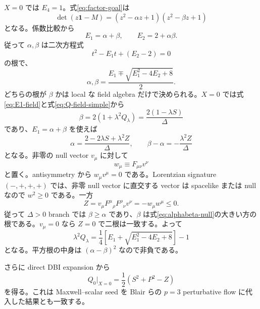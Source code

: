 \documentclass[a4paper,11pt]{ltjsreport}
\newcommand{\Id}{\mathbf 1}
\begin{document}
$X=0$ では $E_4=1$。式\eqref{eq:factor-goal}は
\begin{equation}
 \det(z\Id-M)
 =(z^2-\alpha z+1)(z^2-\beta z+1)
\end{equation}
となる。係数比較から
\begin{equation}
 E_1=\alpha+\beta,
 \qquad
 E_2=2+\alpha\beta.
\end{equation}
従って $\alpha,\beta$ は二次方程式
\begin{equation}
 t^2-E_1t+(E_2-2)=0
\end{equation}
の根で、
\begin{equation}
 \alpha,\beta
 =\frac{E_1\mp\sqrt{E_1^2-4E_2+8}}{2}.
 \label{eq:alphabeta-null}
\end{equation}
どちらの根が $\beta$ かは local な field algebra だけで決められる。$X=0$ では式\eqref{eq:E1-field}と式\eqref{eq:Q-field-simple}から
\begin{equation}
 \beta=2(1+\lambda^2Q_\lambda)
 =\frac{2(1-\lambda S)}{\Delta}
 \label{eq:beta-null-field-note}
\end{equation}
であり、$E_1=\alpha+\beta$ を使えば
\begin{equation}
 \alpha=\frac{2-2\lambda S+\lambda^2Z}{\Delta},
 \qquad
 \beta-\alpha=-\frac{\lambda^2Z}{\Delta}
 \label{eq:alpha-beta-null-note}
\end{equation}
となる。非零の null vector $v_\mu$ に対して
\begin{equation}
 w_\mu\equiv F_{\mu\nu}v^\nu
\end{equation}
と置く。antisymmetry から $w_\mu v^\mu=0$ である。Lorentzian signature $(-,+,+,+)$ では、非零 null vector に直交する vector は spacelike または null なので $w^2\ge0$ である。一方
\begin{equation}
 Z=v_\mu F^\mu{}_{\rho}F^\rho{}_{\nu}v^\nu=-w_\mu w^\mu\le0.
 \label{eq:Z-null-sign-note}
\end{equation}
従って $\Delta>0$ branch では $\beta\ge\alpha$ であり、$\beta$ は式\eqref{eq:alphabeta-null}の大きい方の根である。$v_\mu=0$ なら $Z=0$ で二根は一致する。よって
\begin{equation}
 \lambda^2Q_\lambda
 =\frac14\left[E_1+\sqrt{E_1^2-4E_2+8}\right]-1
 \label{eq:null-flow-E}
\end{equation}
となる。平方根の中身は $(\alpha-\beta)^2$ なので非負である。

さらに direct DBI expansion から
\begin{equation}
 Q_0\big|_{X=0}=\frac12(S^2+P^2-Z)
 \label{eq:null-weak-note}
\end{equation}
を得る。これは Maxwell--scalar seed を Blair らの $p=3$ perturbative flow に代入した結果とも一致する。
\end{document}
